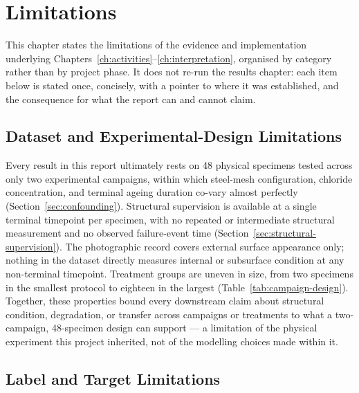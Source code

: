 \chapter{Limitations}
\label{ch:limitations}

This chapter states the limitations of the evidence and implementation
underlying Chapters~\ref{ch:activities}--\ref{ch:interpretation}, organised
by category rather than by project phase. It does not re-run the results
chapter: each item below is stated once, concisely, with a pointer to
where it was established, and the consequence for what the report can and
cannot claim.

\section{Dataset and Experimental-Design Limitations}
\label{sec:lim-dataset}

Every result in this report ultimately rests on 48 physical specimens
tested across only two experimental campaigns, within which steel-mesh
configuration, chloride concentration, and terminal ageing duration
co-vary almost perfectly (Section~\ref{sec:confounding}). Structural
supervision is available at a single terminal timepoint per specimen, with
no repeated or intermediate structural measurement and no observed
failure-event time (Section~\ref{sec:structural-supervision}). The
photographic record covers external surface appearance only; nothing in
the dataset directly measures internal or subsurface condition at any
non-terminal timepoint. Treatment groups are uneven in size, from two
specimens in the smallest protocol to eighteen in the largest
(Table~\ref{tab:campaign-design}). Together, these properties bound every
downstream claim about structural condition, degradation, or transfer
across campaigns or treatments to what a two-campaign, 48-specimen design
can support — a limitation of the physical experiment this project
inherited, not of the modelling choices made within it.

\section{Label and Target Limitations}
\label{sec:lim-labels}

